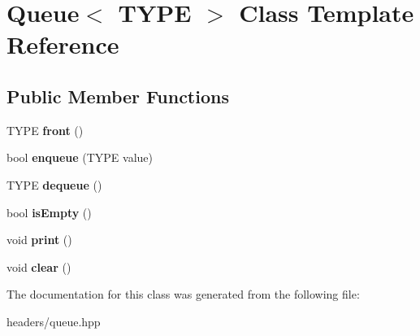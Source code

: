 \hypertarget{classQueue}{}\section{Queue$<$ T\+Y\+P\+E $>$ Class Template Reference}
\label{classQueue}
\subsection*{Public Member Functions}
\begin{DoxyCompactItemize}
\item 
\hypertarget{classQueue_a0a47859a45541aec9192c26a44055445}{}T\+Y\+P\+E {\bfseries front} ()\label{classQueue_a0a47859a45541aec9192c26a44055445}

\item 
\hypertarget{classQueue_af0d8e729c853a5d56b275260b3c63565}{}bool {\bfseries enqueue} (T\+Y\+P\+E value)\label{classQueue_af0d8e729c853a5d56b275260b3c63565}

\item 
\hypertarget{classQueue_ae76570adc4adad92792440083a58d594}{}T\+Y\+P\+E {\bfseries dequeue} ()\label{classQueue_ae76570adc4adad92792440083a58d594}

\item 
\hypertarget{classQueue_a48881097f65860e871b4bd7469f0ba8f}{}bool {\bfseries is\+Empty} ()\label{classQueue_a48881097f65860e871b4bd7469f0ba8f}

\item 
\hypertarget{classQueue_ac6c6e763f72fa7c0556ad29005fdafd7}{}void {\bfseries print} ()\label{classQueue_ac6c6e763f72fa7c0556ad29005fdafd7}

\item 
\hypertarget{classQueue_a9c46e174595c8904960e7c9bc1497578}{}void {\bfseries clear} ()\label{classQueue_a9c46e174595c8904960e7c9bc1497578}

\end{DoxyCompactItemize}


The documentation for this class was generated from the following file\+:\begin{DoxyCompactItemize}
\item 
headers/queue.\+hpp\end{DoxyCompactItemize}
